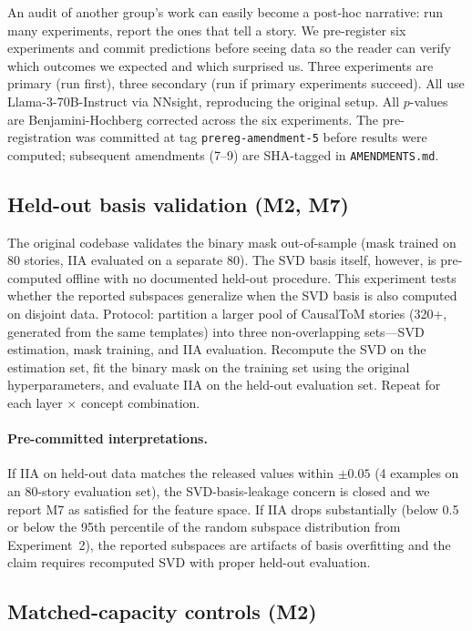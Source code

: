\documentclass{article}
\begin{document}
An audit of another group's work can easily become a post-hoc narrative: run many experiments, report the ones that tell a story. We pre-register six experiments and commit predictions before seeing data so the reader can verify which outcomes we expected and which surprised us. Three experiments are primary (run first), three secondary (run if primary experiments succeed). All use Llama-3-70B-Instruct via NNsight, reproducing the original setup. All $p$-values are Benjamini-Hochberg corrected across the six experiments. The pre-registration was committed at tag \texttt{prereg-amendment-5} before results were computed; subsequent amendments (7--9) are SHA-tagged in \texttt{AMENDMENTS.md}.

\subsection{Held-out basis validation (M2, M7)}

The original codebase validates the binary mask out-of-sample (mask trained on 80 stories, IIA evaluated on a separate 80). The SVD basis itself, however, is pre-computed offline with no documented held-out procedure. This experiment tests whether the reported subspaces generalize when the SVD basis is also computed on disjoint data. Protocol: partition a larger pool of CausalToM stories (320+, generated from the same templates) into three non-overlapping sets---SVD estimation, mask training, and IIA evaluation. Recompute the SVD on the estimation set, fit the binary mask on the training set using the original hyperparameters, and evaluate IIA on the held-out evaluation set. Repeat for each layer $\times$ concept combination.

\paragraph{Pre-committed interpretations.} If IIA on held-out data matches the released values within $\pm 0.05$ (4 examples on an 80-story evaluation set), the SVD-basis-leakage concern is closed and we report M7 as satisfied for the feature space. If IIA drops substantially (below 0.5 or below the 95th percentile of the random subspace distribution from Experiment~2), the reported subspaces are artifacts of basis overfitting and the claim requires recomputed SVD with proper held-out evaluation.

\subsection{Matched-capacity controls (M2)}
\end{document}
